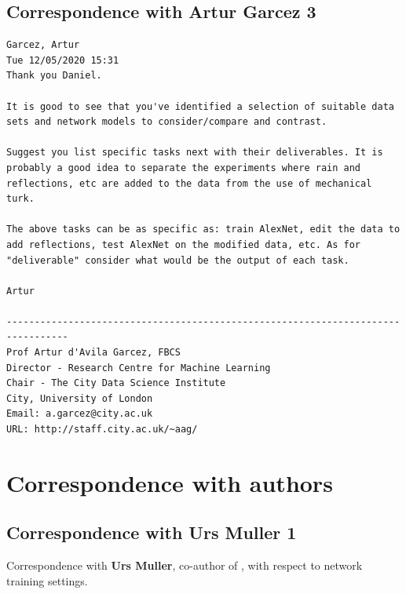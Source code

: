 \subsection{Correspondence with Artur Garcez 3}
\label{met:corr_arthur_3}
\begin{verbatim}
Garcez, Artur
Tue 12/05/2020 15:31
Thank you Daniel.

It is good to see that you've identified a selection of suitable data sets and network models to consider/compare and contrast.

Suggest you list specific tasks next with their deliverables. It is probably a good idea to separate the experiments where rain and reflections, etc are added to the data from the use of mechanical turk.

The above tasks can be as specific as: train AlexNet, edit the data to add reflections, test AlexNet on the modified data, etc. As for "deliverable" consider what would be the output of each task.

Artur

---------------------------------------------------------------------------------
Prof Artur d'Avila Garcez, FBCS
Director - Research Centre for Machine Learning
Chair - The City Data Science Institute
City, University of London
Email: a.garcez@city.ac.uk
URL: http://staff.city.ac.uk/~aag/    
\end{verbatim}

\section{Correspondence with authors}
\label{corr_with_authors}

\subsection{Correspondence with Urs Muller 1}
\label{urs_muller1}
Correspondence with \textbf{Urs Muller}, co-author of \cite{bojarski2016end}, with respect to network training settings.

